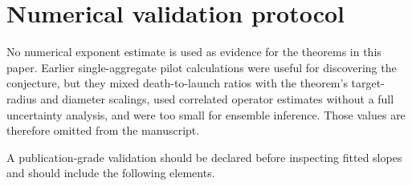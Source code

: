 \documentclass[11pt]{article}
\theoremstyle{mainthm}
\theoremstyle{definition}
\theoremstyle{remark}
\begin{document}
\section{Numerical validation protocol}
\label{sec:validation-protocol}

No numerical exponent estimate is used as evidence for the theorems in this paper. Earlier single-aggregate pilot calculations were useful for discovering the conjecture, but they mixed death-to-launch ratios with the theorem's target-radius and diameter scalings, used correlated operator estimates without a full uncertainty analysis, and were too small for ensemble inference. Those values are therefore omitted from the manuscript.

A publication-grade validation should be declared before inspecting fitted slopes and should include the following elements.
\end{document}
